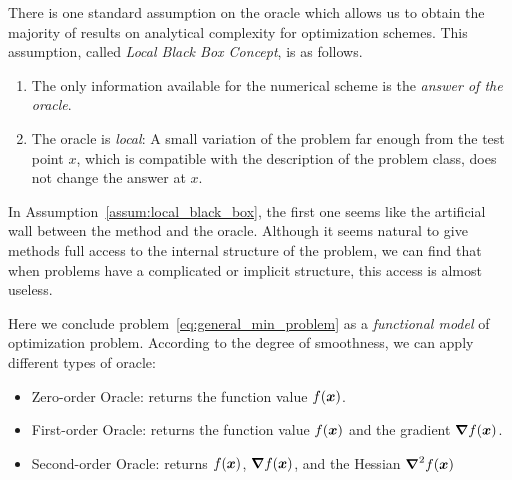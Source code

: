 There is one standard assumption on the oracle which allows us to obtain the majority of results on analytical complexity for optimization schemes. This assumption, called \emph{Local Black Box Concept}, is as follows.

\begin{assum}\label{assum:local_black_box}
    \begin{enumerate}
        \item The only information available for the numerical scheme is the \emph{answer of the oracle}.
        \item The oracle is \emph{local}: A small variation of the problem far enough from the test point \(x\), which is compatible with the description of the problem class, does not change the answer at \(x\).
    \end{enumerate}
\end{assum}

In Assumption~\ref{assum:local_black_box}, the first one seems like the artificial wall between the method and the oracle. Although it seems natural to give methods full access to the internal structure of the problem,
we can find that when problems have a complicated or implicit structure, this access is almost useless.

Here we conclude problem~\ref{eq:general_min_problem} as a \emph{functional model} of optimization problem. According to the degree of smoothness, we can apply different types of oracle:
\begin{itemize}
    \item Zero-order Oracle: returns the function value \(f(\boldsymbol{x})\).
    \item First-order Oracle: returns the function value \(f(\boldsymbol{x})\) and the gradient \(\grad f(\boldsymbol{x})\).
    \item Second-order Oracle: returns \(f(\boldsymbol{x})\), \(\grad f(\boldsymbol{x})\), and the Hessian \(\grad^2 f(\boldsymbol{x})\)
\end{itemize}

